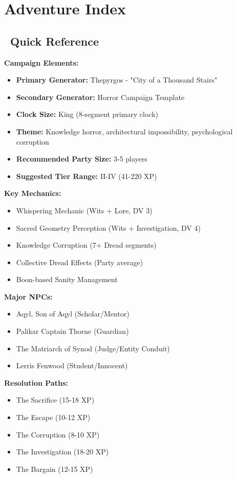 \documentclass[11pt]{article}
\begin{document}
\section{Adventure Index}

\subsection*{\faList\ Quick Reference}

\textbf{Campaign Elements:}
\begin{itemize}
    \item \textbf{Primary Generator:} Thepyrgos - "City of a Thousand Stairs"
    \item \textbf{Secondary Generator:} Horror Campaign Template
    \item \textbf{Clock Size:} King (8-segment primary clock)
    \item \textbf{Theme:} Knowledge horror, architectural impossibility, psychological corruption
    \item \textbf{Recommended Party Size:} 3-5 players
    \item \textbf{Suggested Tier Range:} II-IV (41-220 XP)
\end{itemize}

\textbf{Key Mechanics:}
\begin{itemize}
    \item Whispering Mechanic (Wits + Lore, DV 3)
    \item Sacred Geometry Perception (Wits + Investigation, DV 4)
    \item Knowledge Corruption (7+ Dread segments)
    \item Collective Dread Effects (Party average)
    \item Boon-based Sanity Management
\end{itemize}

\textbf{Major NPCs:}
\begin{itemize}
    \item Aqyl, Son of Aqyl (Scholar/Mentor)
    \item Palikar Captain Thorne (Guardian)
    \item The Matriarch of Synod (Judge/Entity Conduit)
    \item Lerris Fenwood (Student/Innocent)
\end{itemize}

\textbf{Resolution Paths:}
\begin{itemize}
    \item The Sacrifice (15-18 XP)
    \item The Escape (10-12 XP)
    \item The Corruption (8-10 XP)
    \item The Investigation (18-20 XP)
    \item The Bargain (12-15 XP)
\end{itemize}
\end{document}
